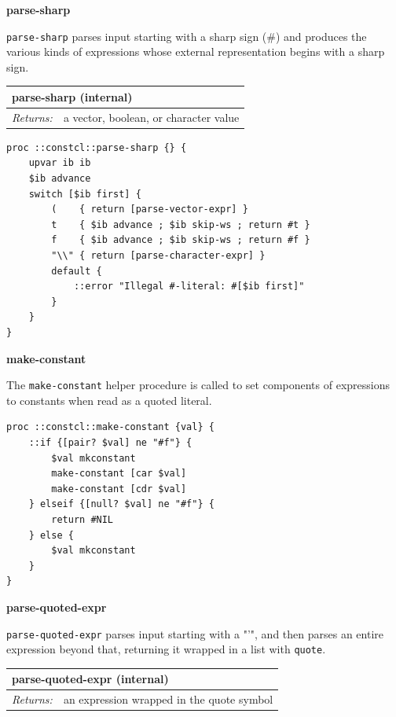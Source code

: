 \documentclass[twoside,9pt]{report}
\begin{document}
\textbf{parse-sharp}


\texttt{parse-sharp} parses input starting with a sharp sign (\#) and produces the various kinds of expressions whose external representation begins with a sharp sign.

\begin{tabular}{ |l l| }
\hline
\multicolumn{2}{|l|}{parse-sharp (internal)} \\
\hline
\textit{Returns:} & a vector, boolean, or character value \\
\hline
\end{tabular}

\noindent\makebox[\linewidth]{\rule{\linewidth}{0.4pt}}
\begin{lstlisting}
proc ::constcl::parse-sharp {} {
    upvar ib ib
    $ib advance
    switch [$ib first] {
        (    { return [parse-vector-expr] }
        t    { $ib advance ; $ib skip-ws ; return #t }
        f    { $ib advance ; $ib skip-ws ; return #f }
        "\\" { return [parse-character-expr] }
        default {
            ::error "Illegal #-literal: #[$ib first]"
        }
    }
}
\end{lstlisting}
\noindent\makebox[\linewidth]{\rule{\linewidth}{0.4pt}}

\textbf{make-constant}


The \texttt{make-constant} helper procedure is called to set components of expressions to constants when read as a quoted literal.

\noindent\makebox[\linewidth]{\rule{\linewidth}{0.4pt}}
\begin{lstlisting}
proc ::constcl::make-constant {val} {
    ::if {[pair? $val] ne "#f"} {
        $val mkconstant
        make-constant [car $val]
        make-constant [cdr $val]
    } elseif {[null? $val] ne "#f"} {
        return #NIL
    } else {
        $val mkconstant
    }
}
\end{lstlisting}
\noindent\makebox[\linewidth]{\rule{\linewidth}{0.4pt}}

\textbf{parse-quoted-expr}


\texttt{parse-quoted-expr} parses input starting with a "'", and then parses an entire expression beyond that, returning it wrapped in a list with \texttt{quote}.

\begin{tabular}{ |l l| }
\hline
\multicolumn{2}{|l|}{parse-quoted-expr (internal)} \\
\hline
\textit{Returns:} & an expression wrapped in the quote symbol \\
\hline
\end{tabular}
\end{document}
